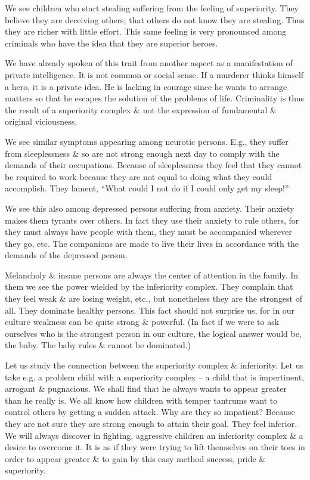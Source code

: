\documentclass{article}
\numberwithin{equation}{section}
\begin{document}
We see children who start stealing suffering from the feeling of superiority. They believe they are deceiving others; that others do not know they are stealing. Thus they are richer with little effort. This same feeling is very pronounced among criminals who have the idea that they are superior heroes.

We have already spoken of this trait from another aspect as a manifestation of private intelligence. It is not common or social sense. If a murderer thinks himself a hero, it is a private idea. He is lacking in courage since he wants to arrange matters so that he escapes the solution of the problems of life. Criminality is thus the result of a superiority complex \& not the expression of fundamental \& original viciousness.

We see similar symptoms appearing among neurotic persons. E.g., they suffer from sleeplessness \& so are not strong enough next day to comply with the demands of their occupations. Because of sleeplessness they feel that they cannot be required to work because they are not equal to doing what they could accomplish. They lament, ``What could I not do if I could only get my sleep!''

We see this also among depressed persons suffering from anxiety. Their anxiety makes them tyrants over others. In fact they use their anxiety to rule others, for they must always have people with them, they must be accompanied wherever they go, etc. The companions are made to live their lives in accordance with the demands of the depressed person.

Melancholy \& insane persons are always the center of attention in the family. In them we see the power wielded by the inferiority complex. They complain that they feel weak \& are losing weight, etc., but nonetheless they are the strongest of all. They dominate healthy persons. This fact should not surprise us, for in our culture weakness can be quite strong \& powerful. (In fact if we were to ask ourselves who is the strongest person in our culture, the logical answer would be, the baby. The baby rules \& cannot be dominated.)

Let us study the connection between the superiority complex \& inferiority. Let us take e.g. a problem child with a superiority complex -- a child that is impertinent, arrogant \& pugnacious. We shall find that he always wants to appear greater than he really is. We all know how children with temper tantrums want to control others by getting a sudden attack. Why are they so impatient? Because they are not sure they are strong enough to attain their goal. They feel inferior. We will always discover in fighting, aggressive children an inferiority complex \& a desire to overcome it. It is as if they were trying to lift themselves on their toes in order to appear greater \& to gain by this easy method success, pride \& superiority.
\end{document}
